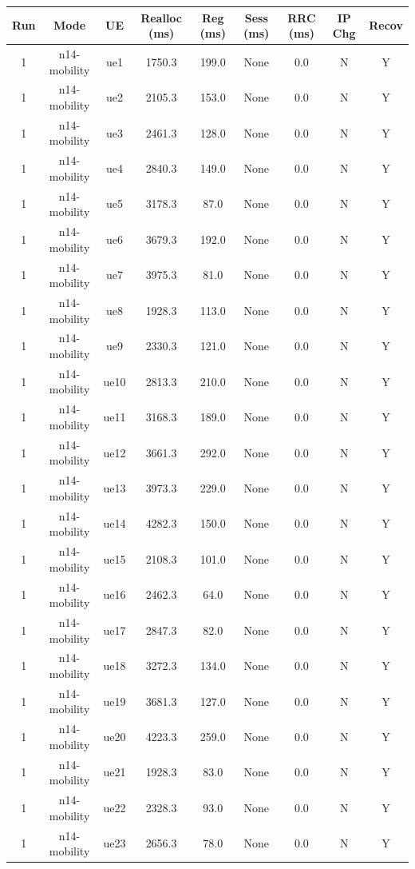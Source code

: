 \begin{table}[ht]
\centering
\begin{tabular}{|c|c|c|c|c|c|c|c|c|}
\hline
Run & Mode & UE & Realloc (ms) & Reg (ms) & Sess (ms) & RRC (ms) & IP Chg & Recov \\
\hline
1 & n14-mobility & ue1 & 1750.3 & 199.0 & None & 0.0 & N & Y \\
1 & n14-mobility & ue2 & 2105.3 & 153.0 & None & 0.0 & N & Y \\
1 & n14-mobility & ue3 & 2461.3 & 128.0 & None & 0.0 & N & Y \\
1 & n14-mobility & ue4 & 2840.3 & 149.0 & None & 0.0 & N & Y \\
1 & n14-mobility & ue5 & 3178.3 & 87.0 & None & 0.0 & N & Y \\
1 & n14-mobility & ue6 & 3679.3 & 192.0 & None & 0.0 & N & Y \\
1 & n14-mobility & ue7 & 3975.3 & 81.0 & None & 0.0 & N & Y \\
1 & n14-mobility & ue8 & 1928.3 & 113.0 & None & 0.0 & N & Y \\
1 & n14-mobility & ue9 & 2330.3 & 121.0 & None & 0.0 & N & Y \\
1 & n14-mobility & ue10 & 2813.3 & 210.0 & None & 0.0 & N & Y \\
1 & n14-mobility & ue11 & 3168.3 & 189.0 & None & 0.0 & N & Y \\
1 & n14-mobility & ue12 & 3661.3 & 292.0 & None & 0.0 & N & Y \\
1 & n14-mobility & ue13 & 3973.3 & 229.0 & None & 0.0 & N & Y \\
1 & n14-mobility & ue14 & 4282.3 & 150.0 & None & 0.0 & N & Y \\
1 & n14-mobility & ue15 & 2108.3 & 101.0 & None & 0.0 & N & Y \\
1 & n14-mobility & ue16 & 2462.3 & 64.0 & None & 0.0 & N & Y \\
1 & n14-mobility & ue17 & 2847.3 & 82.0 & None & 0.0 & N & Y \\
1 & n14-mobility & ue18 & 3272.3 & 134.0 & None & 0.0 & N & Y \\
1 & n14-mobility & ue19 & 3681.3 & 127.0 & None & 0.0 & N & Y \\
1 & n14-mobility & ue20 & 4223.3 & 259.0 & None & 0.0 & N & Y \\
1 & n14-mobility & ue21 & 1928.3 & 83.0 & None & 0.0 & N & Y \\
1 & n14-mobility & ue22 & 2328.3 & 93.0 & None & 0.0 & N & Y \\
1 & n14-mobility & ue23 & 2656.3 & 78.0 & None & 0.0 & N & Y \\

\end{tabular}
\end{table}
